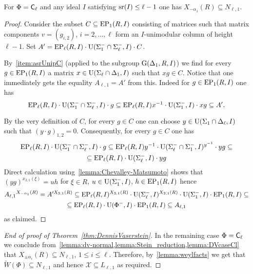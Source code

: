 \begin{lemma} \label{lemma:DVcaseCl}
For $\Phi=\mathsf{C}_\ell$ and any ideal $I$ satisfying $\operatorname{sr}(I) \leq \ell-1$ one has $X_{-\alpha_1}(R) \subseteq N_{\ell, 1}$.
\end{lemma}
\begin{proof}
Consider the subset $C \subseteq \operatorname{EP}_1(R, I)$ consisting of matrices such that matrix components $v=(g_{i,2})$, $i=2,\ldots, \ell$ form an $I$-unimodular column of height $\ell-1$.
Set $A' = \operatorname{EP}_\ell(R, I) \cdot \operatorname{U}(\Sigma_1^- \cap \Sigma_\ell^-, I) \cdot C$.

By~\cref{item:asrUnipC} (applied to the subgroup $\operatorname{G}(\Delta_1, R, I)$) we find for every $g \in \operatorname{EP}_1(R, I)$ a matrix $x \in \operatorname{U}(\Sigma_\ell \cap \Delta_1, I)$ such that $xg \in C$.  
Notice that one immediately gets the equality $A_{\ell, 1} = A'$ from this.
Indeed for $g\in \operatorname{EP}_1(R, I)$ one has
\begin{equation*} \operatorname{EP}_\ell(R, I) \cdot \operatorname{U}(\Sigma_1^- \cap \Sigma_\ell^-, I) \cdot g \subseteq 
 \operatorname{EP}_\ell(R, I)x^{-1}  \cdot \operatorname{U}(\Sigma_1^-, I) \cdot xg \subseteq A'. \end{equation*}

By the very definition of $C$, for every $g \in C$ one can choose $y \in \operatorname{U}(\Sigma_1 \cap \Delta_\ell, I)$ such that $(y \cdot g)_{1,2} = 0$.
Consequently, for every $g\in C$ one has
\begin{multline*}
 \operatorname{EP}_\ell(R, I) \cdot \operatorname{U}(\Sigma_1^- \cap \Sigma_\ell^-, I) \cdot g \subseteq \operatorname{EP}_\ell(R, I) y^{-1} \cdot \operatorname{U}(\Sigma_\ell^-\cap \Sigma_1^-, I)^{y^{-1}} \cdot y g \subseteq \\
  \subseteq \operatorname{EP}_\ell(R, I) \cdot \operatorname{U}(\Sigma_\ell^-, I) \cdot y g
\end{multline*}
Direct calculation using~\cref{lemma:Chevalley-Matsumoto} shows that $(yg)^{x_{2,1}(\xi)} = u h$ for $\xi \in R$, $u \in \operatorname{U}(\Sigma_1^-, I)$, $h \in \operatorname{EP}_1(R, I)$ hence
\begin{multline*} {A_{\ell,1}}^{X_{-\alpha_1}(R)} = A'^{X_{2,1}(R)} \subseteq \operatorname{EP}_\ell(R, I)^{X_{2,1}(R)} \cdot \operatorname{U}(\Sigma_\ell^-, I)^{X_{2,1}(R)} \cdot \operatorname{U}(\Sigma_1^-, I) \cdot \operatorname{EP}_1(R, I) \subseteq \\
 \subseteq \operatorname{EP}_\ell(R, I) \cdot \operatorname{U}(\Phi^-, I) \cdot \operatorname{EP}_1(R, I) \subseteq A_{\ell,1} \end{multline*}
 as claimed.
\end{proof}

\begin{proof}[End of proof of Theorem~\ref{thm:DennisVaserstein}]
In the remaining case $\Phi=\mathsf{C}_\ell$ we conclude from~\cref{lemma:dv-normal,lemma:Stein_reduction,lemma:DVcaseCl} that $X_{\pm \alpha_i}(R) \subseteq N_{\ell,1}$, $1\leq i\leq \ell$.
Therefore, by~\cref{lemma:weylfacts} we get that $\widetilde{W}(\Phi) \subseteq N_{\ell,1}$ and hence $\mathcal{X} \subseteq L_{\ell,1}$ as required.
\end{proof}
